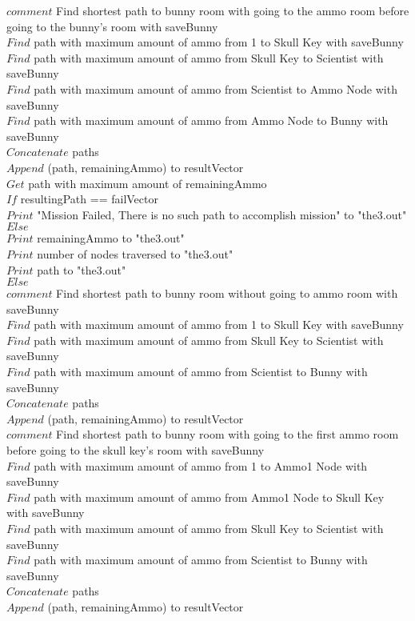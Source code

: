 \documentclass[10pt]{article}
\begin{document}
		$comment$  Find shortest path to bunny room with going to the ammo room before going to the bunny's room with saveBunny \\
		 $Find$ path with maximum amount of ammo from 1 to Skull Key with saveBunny  \\
		 $Find$ path with maximum amount of ammo from Skull Key to Scientist with saveBunny \\
		 $Find$ path with maximum amount of ammo from Scientist to Ammo Node with saveBunny \\
		 $Find$ path with maximum amount of ammo from Ammo Node to Bunny with saveBunny \\
		$Concatenate$ paths  \\
		$Append$ (path, remainingAmmo) to resultVector \\

		$Get$ path with maximum amount of remainingAmmo \\

		$If$ resultingPath == failVector \\
			$Print$ "Mission Failed, There is no such path to accomplish mission" to "the3.out"  \\

		$Else$ \\
			$Print$ remainingAmmo to "the3.out" \\
			$Print$ number of nodes traversed to "the3.out" \\
			$Print$ path to "the3.out" \\

	$Else$ \\
		$comment$  Find shortest path to bunny room without going to ammo room with saveBunny \\
		 $Find$ path with maximum amount of ammo from 1 to Skull Key with saveBunny  \\
		 $Find$ path with maximum amount of ammo from Skull Key to Scientist with saveBunny \\
		 $Find$ path with maximum amount of ammo from Scientist to Bunny with saveBunny \\
		$Concatenate$ paths  \\
		$Append$ (path, remainingAmmo) to resultVector \\

		$comment$  Find shortest path to bunny room with going to the first ammo room before going to the skull key's room with saveBunny \\
		 $Find$ path with maximum amount of ammo from 1 to Ammo1 Node with saveBunny  \\
		 $Find$ path with maximum amount of ammo from Ammo1 Node to Skull Key with saveBunny  \\
		 $Find$ path with maximum amount of ammo from Skull Key to Scientist with saveBunny \\
		 $Find$ path with maximum amount of ammo from Scientist to Bunny with saveBunny \\
		$Concatenate$ paths  \\
		$Append$ (path, remainingAmmo) to resultVector \\
\end{document}
